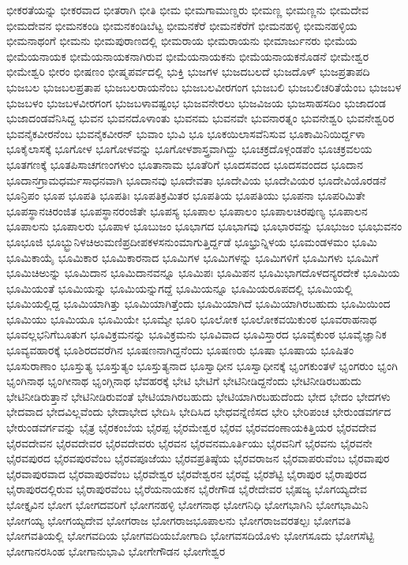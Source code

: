 {ಭೀಕರತೆಯನ್ನು
ಭೀಕರವಾದ
ಭೀತರಾಗಿ
ಭೀತಿ
ಭೀಮ
ಭೀಮಗಾಮುಣ್ಡರು
ಭೀಮಣ್ಣ
ಭೀಮಣ್ಣನು
ಭೀಮದೇವ
ಭೀಮದೇವನ
ಭೀಮನಕಂಡಿ
ಭೀಮನಕಂಡಿಬೆಟ್ಟ
ಭೀಮನಕೆರೆ
ಭೀಮನಕೆರೆಗೆ
ಭೀಮನಹಳ್ಳಿ
ಭೀಮನಹಳ್ಳಿಯ
ಭೀಮನಾಥಂಗೆ
ಭೀಮನು
ಭೀಮಪುರಾಣದಲ್ಲಿ
ಭೀಮರಾಯ
ಭೀಮರಾಯನು
ಭೀಮಾರ್ಜುನರು
ಭೀಮೆಯ
ಭೀಮೆಯನಾಯಕ
ಭೀಮೆಯನಾಯಕನಾಗಿರುವ
ಭೀಮೆಯನಾಯಕನು
ಭೀಮೆಯನಾಯಕನೊಡನೆ
ಭೀಮೇಶ್ವರ
ಭೀಮೇಶ್ವರಿ
ಭೀರಂ
ಭೀಷಣಂ
ಭೀಷ್ಮಪರ್ವದಲ್ಲಿ
ಭುಕ್ತಿ
ಭುಜಗಳ
ಭುಜದಬಲದೆ
ಭುಜದೊಳ್
ಭುಜಪ್ರತಾಪದಿ
ಭುಜಬಲ
ಭುಜಬಲಪ್ರತಾಪ
ಭುಜಬಲರಾಯನೆಂಬ
ಭುಜಬಲವೀರಗಂಗ
ಭುಜಬಲಿ
ಭುಜಬಲಿಚರಿತೆಯೆಂಬ
ಭುಜಬಳ
ಭುಜಬಳಂ
ಭುಜಬಳವೀರಗಂಗ
ಭುಜಬಳಾವಷ್ಟಂಭ
ಭುಜವನೇರಲು
ಭುಜವಿಜಯ
ಭುಜಸಾಹಸದಿಂ
ಭುಜಾದಂಡ
ಭುಜಾದಂಡವೆನಿಸಿದ್ದ
ಭುವನ
ಭುವನದೊಳಾಂತು
ಭುವನಮ
ಭುವನವೇ
ಭುವನಾರತ್ನಂ
ಭುವನೇಶ್ವರಿ
ಭುವನೇಶ್ವರಿರ
ಭುವನೈಕವೀರನೆಂಬ
ಭುವನೈಕವೀರನ್
ಭುವಾಂ
ಭುವಿ
ಭೂ
ಭೂಕಯಿಲಾಸವೆನಿಸುವ
ಭೂಕಾಮಿನಿಯಿರ್ದ್ದಳಾ
ಭೂಕೈಲಾಸಕ್ಕೆ
ಭೂಗೋಳ
ಭೂಗೋಳವನ್ನು
ಭೂಗೋಳಶಾಸ್ತ್ರವಾಗಿದ್ದು
ಭೂಚಕ್ರದೊಳ್ಗಂಡಪೆಂ
ಭೂಚಕ್ರವಲಯ
ಭೂತಗಣಕ್ಕೆ
ಭೂತಪಿಸಾಚಗಣಂಗಳುಂ
ಭೂತಾನಾಮ
ಭೂತೆರಿಗೆ
ಭೂದಸವಂದ
ಭೂದಸವಂದದ
ಭೂದಾನ
ಭೂದಾನಗ್ರಾಮಧರ್ಮಸಾಧನವಾಗಿ
ಭೂದಾನವು
ಭೂದೇವತಾ
ಭೂದೇವಿಯ
ಭೂದೇವಿಯರ
ಭೂದೇವಿಯೊರಡನೆ
ಭೂನ್ರಿಪಂ
ಭೂಪ
ಭೂಪತಿ
ಭೂಪತಿಃ
ಭೂಪತಿಕ್ರಮಿತರ
ಭೂಪತಿಯ
ಭೂಪತಿಯು
ಭೂಪನಾ
ಭೂಪರಿಮಿತೇ
ಭೂಪಸ್ಥಾನಚಿರಂಜಿತ
ಭೂಪಸ್ಥಾನರಂಜಿತೇ
ಭೂಪಸ್ಯ
ಭೂಪಾಲ
ಭೂಪಾಲಂ
ಭೂಪಾಲಚಿರಪುಣ್ಯ
ಭೂಪಾಲನ
ಭೂಪಾಲನು
ಭೂಪಾಲರು
ಭೂಪಾಳ
ಭೂಬುಜಂ
ಭೂಭಾಗದ
ಭೂಭಾಗವು
ಭೂಭಾರವನ್ನು
ಭೂಭುಜಂ
ಭೂಭುವನಂ
ಭೂಭೂಜಿ
ಭೂಭ್ಭ್ರುನಿಳಚಿಅುಮಣಿಪ್ರದೀಪಕಳಸನುಂಮಾಗುತ್ತಿರ್ದ್ದಡೆ
ಭೂಭ್ರುನ್ನಿಳಯ
ಭೂಮಂಡಳಮಂ
ಭೂಮಿ
ಭೂಮಿಕಾಯೈ
ಭೂಮಿಕಾರ
ಭೂಮಿಕಾರನಾದ
ಭೂಮಿಗಳ
ಭೂಮಿಗಳನ್ನು
ಭೂಮಿಗಳಿಗೆ
ಭೂಮಿಗಳು
ಭೂಮಿಗೆ
ಭೂಮಿಚಿಅುನ್ನು
ಭೂಮಿದಾನ
ಭೂಮಿದಾನವನ್ನೂ
ಭೂಮಿಪಃ
ಭೂಮಿಪನ
ಭೂಮಿಭಾಗದೊಳದನ್ಯರದೇಕೆ
ಭೂಮಿಯ
ಭೂಮಿಯಂತೆ
ಭೂಮಿಯನ್ನು
ಭೂಮಿಯನ್ನುಗದ್ದೆ
ಭೂಮಿಯನ್ನೂ
ಭೂಮಿಯರೂಪದಲ್ಲಿ
ಭೂಮಿಯಲ್ಲಿ
ಭೂಮಿಯಲ್ಲಿದ್ದ
ಭೂಮಿಯಾಗಿತ್ತು
ಭೂಮಿಯಾಗಿತ್ತೆಂದು
ಭೂಮಿಯಾಗಿದೆ
ಭೂಮಿಯಾಗಿರಬಹುದು
ಭೂಮಿಯಿಂದ
ಭೂಮಿಯು
ಭೂಮಿಯೂ
ಭೂಮಿಯೇ
ಭೂಮ್ಯೇ
ಭೂರಿ
ಭೂಲೋಕ
ಭೂಲೋಕವಯಿಕುಂಠ
ಭೂವರಾಹನಾಥ
ಭೂವಲ್ಲಭನಿಗೆಬೂತುಗ
ಭೂವಿಕ್ರಮನನ್ನು
ಭೂವಿಕ್ರಮನು
ಭೂವಿವಾದ
ಭೂವಿಸ್ತಾರದ
ಭೂವೈಕುಂಠ
ಭೂವೈಜ್ಞಾನಿಕ
ಭೂವ್ಯವಹಾರಕ್ಕೆ
ಭೂಶಿರದವರೆಗಿನ
ಭೂಷಣನಾಗಿದ್ದನೆಂದು
ಭೂಷಣರು
ಭೂಷಾ
ಭೂಷಾಯ
ಭೂಷಿತಂ
ಭೂಸುರಾಣಾಂ
ಭೂಸ್ತುತ್ಯ
ಭೂಸ್ತುತ್ಯಂ
ಭೂಸ್ತುತ್ಯನಾದ
ಭೂಸ್ವಾಧೀನ
ಭೂಸ್ವಾಧೀನಕ್ಕೆ
ಭೃಂಗಕುಂತಳೆ
ಭೃಂಗರುಂ
ಭೃಂಗಿ
ಭೃಂಗಿನಾಥ
ಭೃಂಗೀನಾಥ
ಭೃಂಗ್ಗಿನಾಥ
ಭೆವಹರಕ್ಕೆ
ಭೇಟಿ
ಭೇಟಿಗೆ
ಭೇಟಿನೀಡಿದ್ದನೆಂದು
ಭೇಟಿನೀಡಿರಬಹುದು
ಭೇಟಿನೀಡಿರುತ್ತಾನೆ
ಭೇಟಿನೀಡಿರುವಂತೆ
ಭೇಟಿಯಾಗಿರಬಹುದು
ಭೇಟಿಯಾಗಿರಬಹುದೆಂದು
ಭೇದ
ಭೇದಂ
ಭೇದಗಳು
ಭೇದವಾದ
ಭೇದವಿಲ್ಲವೆಂದು
ಭೇದಾಭೇದ
ಭೇದಿಸಿ
ಭೇದಿಸಿದ
ಭೇಧವನ್ನೆಣಿಸದ
ಭೇರಿ
ಭೇರಿಪಂಚ
ಭೇರುಂಡವರ್ಗದ
ಭೇರುಂಡವರ್ಗವನ್ನು
ಭೈತ್ರ
ಭೈರಕಂಬೆಯ
ಭೈರಪ್ಪ
ಭೈರಮೇಶ್ವರ
ಭೈರವ
ಭೈರವದಂಣಾಯಕಿತ್ತಿಯರ
ಭೈರವದೇವ
ಭೈರವದೇವನ
ಭೈರವದೇವರ
ಭೈರವದೇವರು
ಭೈರವನ
ಭೈರವನಮೂರ್ತಿಯು
ಭೈರವನಿಗೆ
ಭೈರವನು
ಭೈರವನೇ
ಭೈರವಪುರದ
ಭೈರವಪುರವೆಂಬ
ಭೈರವಪೂಜೆಯು
ಭೈರವಪ್ರತಿಷ್ಠೆಯ
ಭೈರವರಾಜನ
ಭೈರವಾಪರುವೆಂಬ
ಭೈರವಾಪುರ
ಭೈರವಾಪುರವಾದ
ಭೈರವಾಪುರವೆಂಬ
ಭೈರವೇಶ್ವರ
ಭೈರವೇಶ್ವರನ
ಭೈರವ್ವೆ
ಭೈರಶೆಟ್ಟಿ
ಭೈರಾಪುರ
ಭೈರಾಪುರದ
ಭೈರಾಪುರದಲ್ಲಿರುವ
ಭೈರಾಪುರವೆಂಬ
ಭೈರೆಯನಾಯಕನ
ಭೈರೇಗೌಡ
ಭೈರೇದೇವರ
ಭೈಷಜ್ಯ
ಭೊಗಯ್ಯದೇವ
ಭೋಕ್ತೃವಿನ
ಭೋಗ
ಭೋಗದವರಿಗೆ
ಭೋಗನಹಳ್ಳಿ
ಭೋಗನಾಥ
ಭೋಗನಿಧಿ
ಭೋಗಭಾಗಿನಿ
ಭೋಗಭಾಮಿನಿ
ಭೋಗಯ್ಯ
ಭೋಗಯ್ಯದೇವ
ಭೋಗರಾಜ
ಭೋಗರಾಜಭೂಪಾಲನು
ಭೋಗರಾಜವರತಲ್ಪಃ
ಭೋಗವತಿ
ಭೋಗವತಿಯಲ್ಲಿ
ಭೋಗವದಿಯ
ಭೋಗವದಿಯಬೋಗಾದಿ
ಭೋಗವಸದಿಯೊಳು
ಭೋಗಸೂದು
ಭೋಗಸೆಟ್ಟಿ
ಭೋಗಾನರಸಿಂಹ
ಭೋಗಾನುಭಾವಿ
ಭೋಗೇಗೌಡನ
ಭೋಗೇಶ್ವರ
}
